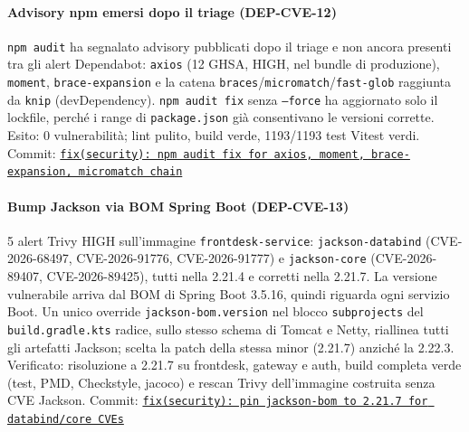 ﻿\documentclass[a4paper,12pt]{report}
\newcommand{\commitref}[2]{\texttt{\small \href{https://github.com/diegoandruccioli/hotel-pms/commit/#1}{#2}}}
\begin{document}
\paragraph{Advisory npm emersi dopo il triage (DEP-CVE-12)}
\texttt{npm audit} ha segnalato advisory pubblicati dopo il triage e non
ancora presenti tra gli alert Dependabot: \texttt{axios} (12 GHSA, HIGH, nel
bundle di produzione), \texttt{moment}, \texttt{brace-expansion} e la catena
\texttt{braces}/\texttt{micromatch}/\texttt{fast-glob} raggiunta da
\texttt{knip} (devDependency). \texttt{npm audit fix} senza \texttt{--force}
ha aggiornato solo il lockfile, perché i range di \texttt{package.json} già
consentivano le versioni corrette. Esito: 0 vulnerabilità; lint pulito, build
verde, 1193/1193 test Vitest verdi.
Commit: \commitref{88d28e3d}{fix(security): npm audit fix for axios, moment, brace-expansion, micromatch chain}

\paragraph{Bump Jackson via BOM Spring Boot (DEP-CVE-13)}
5 alert Trivy HIGH sull'immagine \texttt{frontdesk-service}:
\texttt{jackson-databind} (CVE-2026-68497, CVE-2026-91776, CVE-2026-91777) e
\texttt{jackson-core} (CVE-2026-89407, CVE-2026-89425), tutti nella 2.21.4 e
corretti nella 2.21.7. La versione vulnerabile arriva dal BOM di Spring Boot
3.5.16, quindi riguarda ogni servizio Boot. Un unico override
\texttt{jackson-bom.version} nel blocco \texttt{subprojects} del
\texttt{build.gradle.kts} radice, sullo stesso schema di Tomcat e Netty,
riallinea tutti gli artefatti Jackson; scelta la patch della stessa minor
(2.21.7) anziché la 2.22.3. Verificato: risoluzione a 2.21.7 su frontdesk,
gateway e auth, build completa verde (test, PMD, Checkstyle, jacoco) e
rescan Trivy dell'immagine costruita senza CVE Jackson.
Commit: \commitref{08106221}{fix(security): pin jackson-bom to 2.21.7 for databind/core CVEs}
\end{document}
